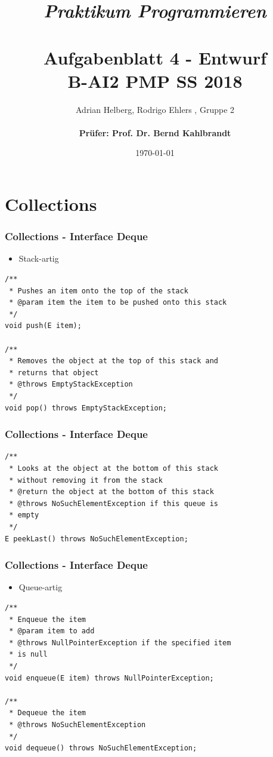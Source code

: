 \documentclass{beamer}
\title{
	\textit{Praktikum Programmieren} \\
	\textbf{\\Aufgabenblatt 4 - Entwurf} \\
	\scriptsize{B-AI2 PMP SS 2018}
}
\author{Adrian Helberg, Rodrigo Ehlers , Gruppe 2 \\\textbf{\\ Prüfer: Prof. Dr. Bernd Kahlbrandt}}
\date{\today}
\begin{document}

\maketitle

\frame{\tableofcontents}


\section{Collections}
\begin{frame}[fragile]
\frametitle{Collections - Interface Deque}

\begin{itemize}
\setlength{\itemsep}{8pt}
\item Stack-artig
\end{itemize}

\begin{lstlisting}
/**
 * Pushes an item onto the top of the stack
 * @param item the item to be pushed onto this stack
 */
void push(E item);

/**
 * Removes the object at the top of this stack and
 * returns that object
 * @throws EmptyStackException
 */
void pop() throws EmptyStackException;
\end{lstlisting}

\end{frame}

\begin{frame}[fragile]
\frametitle{Collections - Interface Deque}

\begin{lstlisting}
/**
 * Looks at the object at the bottom of this stack 
 * without removing it from the stack
 * @return the object at the bottom of this stack
 * @throws NoSuchElementException if this queue is 
 * empty
 */
E peekLast() throws NoSuchElementException;
\end{lstlisting}

\end{frame}

\begin{frame}[fragile]
\frametitle{Collections - Interface Deque}

\begin{itemize}
\setlength{\itemsep}{8pt}
\item Queue-artig
\end{itemize}

\begin{lstlisting}
/**
 * Enqueue the item
 * @param item to add
 * @throws NullPointerException if the specified item 
 * is null
 */
void enqueue(E item) throws NullPointerException;

/**
 * Dequeue the item
 * @throws NoSuchElementException
 */
void dequeue() throws NoSuchElementException;
\end{lstlisting}

\end{frame}
\end{document}
